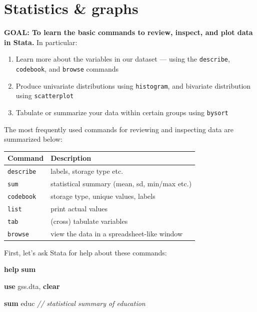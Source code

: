 \documentclass[
]{book}
\newenvironment{Shaded}{\begin{snugshade}}{\end{snugshade}}
\newcommand{\CommentTok}[1]{\textcolor[rgb]{0.56,0.35,0.01}{\textit{#1}}}
\newcommand{\KeywordTok}[1]{\textcolor[rgb]{0.13,0.29,0.53}{\textbf{#1}}}
\newcommand{\NormalTok}[1]{#1}
\providecommand{\tightlist}{%
  \setlength{\itemsep}{0pt}\setlength{\parskip}{0pt}}
\begin{document}
\hypertarget{statistics-graphs}{%
\section{Statistics \& graphs}\label{statistics-graphs}}

\textbf{GOAL: To learn the basic commands to review, inspect, and plot data in Stata.} In particular:

\begin{enumerate}
\def\labelenumi{\arabic{enumi}.}
\tightlist
\item
  Learn more about the variables in our dataset --- using the \texttt{describe}, \texttt{codebook}, and \texttt{browse} commands
\item
  Produce univariate distributions using \texttt{histogram}, and bivariate distribution using \texttt{scatterplot}
\item
  Tabulate or summarize your data within certain groups using \texttt{bysort}
\end{enumerate}

The most frequently used commands for reviewing and inspecting data are summarized below:

\begin{longtable}[]{@{}ll@{}}
\toprule
Command & Description\tabularnewline
\midrule
\endhead
\texttt{describe} & labels, storage type etc.\tabularnewline
\texttt{sum} & statistical summary (mean, sd, min/max etc.)\tabularnewline
\texttt{codebook} & storage type, unique values, labels\tabularnewline
\texttt{list} & print actual values\tabularnewline
\texttt{tab} & (cross) tabulate variables\tabularnewline
\texttt{browse} & view the data in a spreadsheet-like window\tabularnewline
\bottomrule
\end{longtable}

First, let's ask Stata for help about these commands:

\begin{Shaded}
\begin{Highlighting}[]
\KeywordTok{help} \KeywordTok{sum}
\end{Highlighting}
\end{Shaded}

\begin{Shaded}
\begin{Highlighting}[]
\KeywordTok{use}\NormalTok{ gss.dta, }\KeywordTok{clear}

\KeywordTok{sum}\NormalTok{ educ }\CommentTok{// statistical summary of education}
\end{Highlighting}
\end{Shaded}
\end{document}
